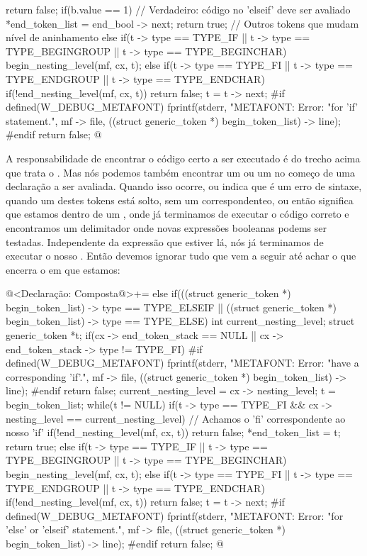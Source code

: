 {{{{{          return false;
        if(b.value == 1){ // Verdadeiro: código no 'elseif' deve ser avaliado
          *end_token_list = end_bool -> next;
          return true;
        }
      }
      // Outros tokens que mudam nível de aninhamento
      else if(t -> type == TYPE_IF || t -> type == TYPE_BEGINGROUP ||
              t -> type == TYPE_BEGINCHAR)
        begin_nesting_level(mf, cx, t);
      else if(t -> type == TYPE_FI || t -> type == TYPE_ENDGROUP ||
              t -> type == TYPE_ENDCHAR)
        if(!end_nesting_level(mf, cx, t))
          return false;
      t = t -> next;
    }
  }
#if defined(W_DEBUG_METAFONT)
  fprintf(stderr, "METAFONT: Error: %
          "for 'if' statement.\n", mf -> file,
          ((struct generic_token *) begin_token_list) -> line);
#endif  
  return false;
}
@
\fimcodigo

A responsabilidade de encontrar o código certo a ser executado é do
trecho acima que trata o . Mas nós podemos também
encontrar um  ou um  no começo de
uma declaração a ser avaliada. Quando isso ocorre, ou indica que é um
erro de sintaxe, quando um destes tokens está solto, sem
um  correspondenteo, ou então significa que estamos
dentro de um , onde já terminamos de executar o código
correto e encontramos um delimitador onde novas expressões booleanas
podems ser testadas. Independente da expressão que estiver lá, nós já
terminamos de executar o nosso . Então devemos ignorar
tudo que vem a seguir até achar o  que encerra
o  em que estamos:

\iniciocodigo
@<Declaração: Composta@>+=
else if(((struct generic_token *) begin_token_list) -> type ==
        TYPE_ELSEIF ||
        ((struct generic_token *) begin_token_list) -> type ==
        TYPE_ELSE){
  int current_nesting_level;
  struct generic_token *t;
  if(cx -> end_token_stack == NULL ||
     cx -> end_token_stack -> type != TYPE_FI){
#if defined(W_DEBUG_METAFONT)
  fprintf(stderr, "METAFONT: Error: %
          "have a corresponding 'if'.\n", mf -> file,
          ((struct generic_token *) begin_token_list) -> line);
#endif  
    return false;
  }
  current_nesting_level = cx -> nesting_level;
  t = begin_token_list;
  while(t != NULL){
    if(t -> type == TYPE_FI && cx -> nesting_level == current_nesting_level){
      // Achamos o 'fi' correspondente ao nosso 'if'
      if(!end_nesting_level(mf, cx, t))
        return false;
      *end_token_list = t;
      return true;
    }
    else if(t -> type == TYPE_IF || t -> type == TYPE_BEGINGROUP ||
            t -> type == TYPE_BEGINCHAR)
      begin_nesting_level(mf, cx, t);
    else if(t -> type == TYPE_FI || t -> type == TYPE_ENDGROUP ||
            t -> type == TYPE_ENDCHAR)
      if(!end_nesting_level(mf, cx, t))
        return false;
    t = t -> next;
  }
#if defined(W_DEBUG_METAFONT)
  fprintf(stderr, "METAFONT: Error: %
          "for 'else' or 'elseif' statement.\n", mf -> file,
          ((struct generic_token *) begin_token_list) -> line);
#endif
  return false;
}
@
\fimcodigo

}
